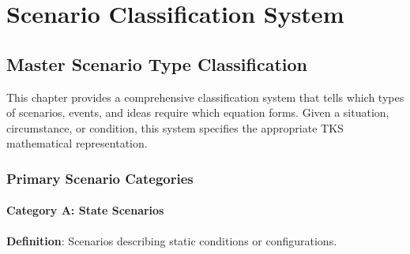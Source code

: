 \documentclass[11pt,twoside]{book}
\begin{document}
\part{Scenario Classification System}

\chapter{Master Scenario Type Classification}
\label{ch:scenario-classification}

\begin{tcolorbox}[colback=gray!5!white,colframe=gray!75!black,title=\textbf{Scenario Classification Purpose},breakable]
This chapter provides a comprehensive classification system that tells which types
of scenarios, events, and ideas require which equation forms. Given a situation,
circumstance, or condition, this system specifies the appropriate TKS mathematical
representation.
\end{tcolorbox}

\section{Primary Scenario Categories}

\subsection{Category A: State Scenarios}

\textbf{Definition}: Scenarios describing static conditions or configurations.
\end{document}
